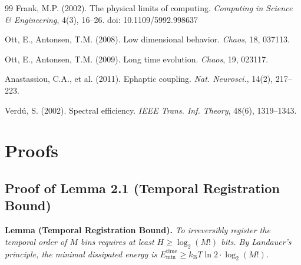 \documentclass[12pt]{article}
\numberwithin{equation}{section}
\newcommand{\kB}{k_{\mathrm{B}}}
\begin{document}
\begin{thebibliography}{99}
Frank, M.P. (2002). The physical limits of computing. \textit{Computing in Science \& Engineering}, 4(3), 16--26. doi: 10.1109/5992.998637

Ott, E., Antonsen, T.M. (2008). Low dimensional behavior. \textit{Chaos}, 18, 037113.

Ott, E., Antonsen, T.M. (2009). Long time evolution. \textit{Chaos}, 19, 023117.

Anastassiou, C.A., et al. (2011). Ephaptic coupling. \textit{Nat. Neurosci.}, 14(2), 217--223.

Verd{\'u}, S. (2002). Spectral efficiency. \textit{IEEE Trans. Inf. Theory}, 48(6), 1319--1343.

\end{thebibliography}

\appendix

\section{Proofs}
\label{appendix:proofs}

\subsection{Proof of Lemma 2.1 (Temporal Registration Bound)}

\noindent\textbf{Lemma (Temporal Registration Bound).} \emph{To irreversibly register the temporal order of $M$ bins requires at least $H \ge \log_2(M!)$ bits. By Landauer's principle, the minimal dissipated energy is $E_{\min}^{\mathrm{time}} \ge \kB T\ln 2 \cdot \log_2(M!)$.}
\end{document}
